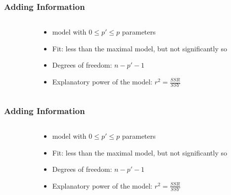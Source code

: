 \documentclass[xcolor={table},handout]{beamer}
\begin{document}
\begin{frame}\frametitle{Adding Information}
\begin{columns}
\begin{column}{0.6\textwidth}
\end{column}
\begin{column}{0.4\textwidth}
\begin{itemize}
\item model with $0 \le p' \le p$ parameters
\item Fit: less than the maximal model, but not significantly so
\item Degrees of freedom: $n-p'-1$
\item Explanatory power of the model: $r^2 = \frac{SSR}{SSY}$    
\end{itemize}
\end{column}
\end{columns}
\end{frame}

\begin{frame}\frametitle{Adding Information}
\begin{columns}
\begin{column}{0.6\textwidth}
\end{column}
\begin{column}{0.4\textwidth}
\begin{itemize}
\item model with $0 \le p' \le p$ parameters
\item Fit: less than the maximal model, but not significantly so
\item Degrees of freedom: $n-p'-1$
\item Explanatory power of the model: $r^2 = \frac{SSR}{SSY}$    
\end{itemize}
\end{column}
\end{columns}
\end{frame}
\end{document}
